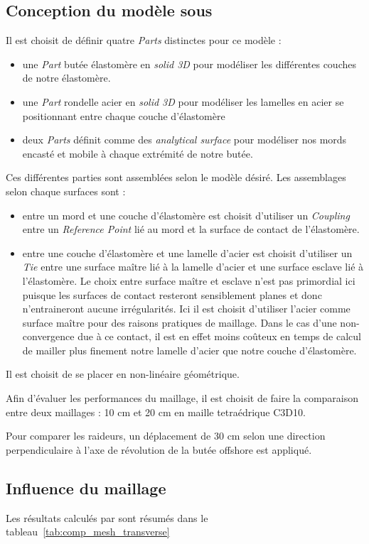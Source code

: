﻿\documentclass{article}
\newcommand{\abaqus}{\bsc{Abaqus}\xspace}
\newcommand{\fa}[1]{\textit{#1}\xspace}
\begin{document}
\subsection{Conception du modèle sous \abaqus}
Il est choisit de définir quatre \fa{Parts} distinctes pour ce modèle :
\begin{itemize}
\item une \fa{Part} butée élastomère en \fa{solid 3D} pour modéliser les différentes couches de notre élastomère.
\item une \fa{Part} rondelle acier en \fa{solid 3D} pour modéliser les lamelles en acier se positionnant entre chaque couche d'élastomère
\item deux \fa{Parts} définit comme des \fa{analytical surface} pour modéliser nos mords encasté et mobile à chaque extrémité de notre butée. 
\end{itemize}

Ces différentes parties sont assemblées selon le modèle désiré. Les assemblages selon chaque surfaces sont :
\begin{itemize}
\item entre un mord et une couche d'élastomère est choisit d'utiliser un \fa{Coupling} entre un \fa{Reference Point} lié au mord et la surface de contact de l'élastomère.
\item entre une couche d'élastomère et une lamelle d'acier est choisit d'utiliser un \fa{Tie} entre une surface maître lié à la lamelle d'acier et une surface esclave lié à l'élastomère. Le choix entre surface maître et esclave n'est pas primordial ici puisque les surfaces de contact resteront sensiblement planes et donc n'entraineront aucune irrégularités. Ici il est choisit d'utiliser l'acier comme surface maître pour des raisons pratiques de maillage. Dans le cas d'une non-convergence due à ce contact, il est en effet moins coûteux en temps de calcul de mailler plus finement notre lamelle d'acier que notre couche d'élastomère.
\end{itemize}

Il est choisit de se placer en non-linéaire géométrique. %

Afin d'évaluer les performances du maillage, il est choisit de faire la comparaison entre deux maillages : 10 cm et 20 cm en maille tetraédrique C3D10.

Pour comparer les raideurs, un déplacement de 30 cm selon une direction perpendiculaire à l'axe de révolution de la butée offshore est appliqué. 

\subsection{Influence du maillage}
Les résultats calculés par \abaqus sont résumés dans le tableau~\ref{tab:comp_mesh_transverse}
\end{document}
